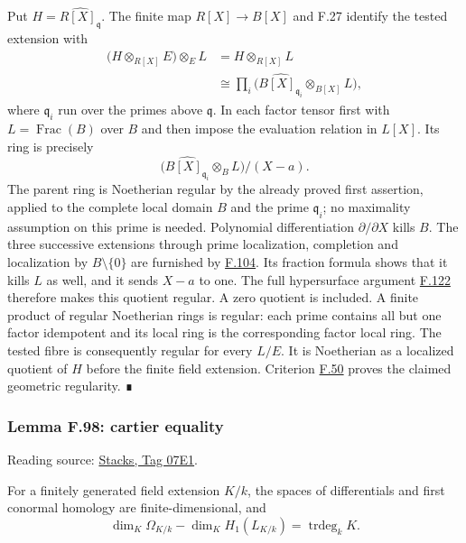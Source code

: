 \documentclass[11pt,a4paper,openany]{report}
\begin{document}
Put \(H=\widehat{R[X]_{\mathfrak q}}\). The finite map \(R[X]\to B[X]\) and F.27 identify the tested extension with \[\begin{aligned}
\bigl(H\otimes_{R[X]}E\bigr)\otimes_EL
&=H\otimes_{R[X]}L\\
&\cong\prod_i\bigl(\widehat{B[X]_{\mathfrak q_i}}\otimes_{B[X]}L\bigr),
\end{aligned}\] where \(\mathfrak q_i\) run over the primes above \(\mathfrak q\). In each factor tensor first with \(L=\operatorname{Frac}(B)\) over \(B\) and then impose the evaluation relation in \(L[X]\). Its ring is precisely \[\bigl(\widehat{B[X]_{\mathfrak q_i}}\otimes_BL\bigr)/(X-a).\] The parent ring is Noetherian regular by the already proved first assertion, applied to the complete local domain \(B\) and the prime \(\mathfrak q_i\); no maximality assumption on this prime is needed. Polynomial differentiation \(\partial/\partial X\) kills \(B\). The three successive extensions through prime localization, completion and localization by \(B\setminus\{0\}\) are furnished by \hyperref[AG-RG-S05-more-algebra-lemma-derivation-extends]{F.104}. Its fraction formula shows that it kills \(L\) as well, and it sends \(X-a\) to one. The full hypersurface argument \hyperref[AG-RG-S05-more-algebra-lemma-quotient-regular]{F.122} therefore makes this quotient regular. A zero quotient is included. A finite product of regular Noetherian rings is regular: each prime contains all but one factor idempotent and its local ring is the corresponding factor local ring. The tested fibre is consequently regular for every \(L/E\). It is Noetherian as a localized quotient of \(H\) before the finite field extension. Criterion \hyperref[AG-RG-S05-algebra-lemma-geometrically-regular]{F.50} proves the claimed geometric regularity. ∎

\label{AG-RG-S05-more-algebra-lemma-cartier-equality}

\subsubsection{Lemma F.98: cartier equality}\label{AG-RG-S05-lemma-f.98-cartier-equality}

Reading source: \href{https://stacks.math.columbia.edu/tag/07E1}{Stacks, Tag 07E1}.

For a finitely generated field extension \(K/k\), the spaces of differentials and first conormal homology are finite-dimensional, and \[
\dim_K\Omega_{K/k}-\dim_K H_1(L_{K/k})
=\operatorname{trdeg}_k K.
\]
\end{document}
